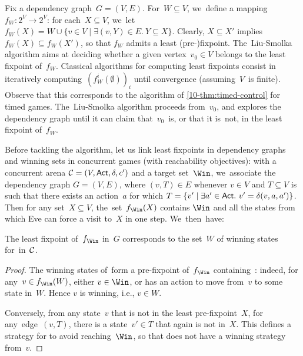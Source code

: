 Fix a dependency graph~$G=(V,E)$. 
For~$W\subseteq V$,
we~define a mapping $f_W\colon 2^V\to 2^V$: for
each~$X\subseteq V$, we~let $f_W(X)=W\cup \{v\in V\mid \exists (v,Y)\in
E.\ Y\subseteq X\}$.
%
Clearly, $X\subseteq X'$ implies $f_W(X)\subseteq f_W(X')$, so that $f_W$ admits
a least (pre-)fixpoint.
The~Liu-Smolka
algorithm aims at deciding whether a given vertex~$v_0\in V$ belongs
to the least fixpoint of~$f_W$.  Classical algorithms for computing
least fixpoints consist in iteratively
computing~$(f_W^i(\emptyset))_i$ until convergence (assuming~$V$~is
finite). Observe that this corresponds to the algorithm of \cref{10-thm:timed-control}
for timed games.
The~Liu-Smolka algorithm proceeds from~$v_0$, and explores
the dependency graph until it can claim that~$v_0$~is, or that it
is~not, in the least fixpoint of~$f_W$.


Before tackling the algorithm, let us link least fixpoints in
dependency graphs and winning sets in concurrent games (with
reachability objectives): with a concurrent arena
$\mathcal C=(V,\textsf{Act},\delta,c')$ and a target set~$\Win$, we~associate
the dependency graph $G=(V,E)$, where $(v,T)\in E$ whenever $v\in V$
and $T\subseteq V$ is such that there exists an action~$a$ for which
$T=\{v' \mid \exists a'\in\Act.\ v'=\delta(v,a,a')\}$.  Then for any
set~$X\subseteq V$, the~set~$f_{\Win}(X)$ contains $\Win$ and all the
states from which Eve can force a visit to~$X$ in one step.
We~then~have:
\begin{proposition}\label{10-prop:fixp-game}
The least fixpoint of~$f_{\Win}$ in~$G$ corresponds to the set~$W$ of
winning states for~\Eve in~$\mathcal C$.
\end{proposition}

\begin{proof}
  The winning states of~\Eve form a pre-fixpoint of~$f_{\Win}$
  containing~\Win: indeed, for any~$v\in f_{\Win}(W)$, either $v\in
  \Win$, or \Eve has an action to move from~$v$ to some state
  in~$W$. Hence $v$ is winning, i.e., $v\in W$.
  

  Conversely, from any state~$v$ that is not in the least
  pre-fixpoint~$X$, for any~edge~$(v,T)$, there is a state~$v'\in T$
  that again is not in~$X$. This defines a strategy for \Adam to avoid
  reaching~$\Win$, so that \Eve does not have a winning strategy from~$v$.
\end{proof}



